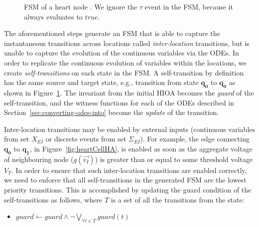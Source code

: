 
\begin{figure}
	\centering 
	\caption{\acf{FSM} of a heart node \label{fig:heartCellFSM}. We ignore
		the $\tau$ event in the \ac{FSM}, because it always evaluates to
		$true$.}
\end{figure}

The aforementioned steps generate an \ac{FSM} that is able to capture
the instantaneous transitions across locations called
\textit{inter-location} transitions, but is unable to capture the
evolution of the continuous variables via the \acp{ODE}. In order to
replicate the continuous evolution of variables within the locations, we
create \textit{self-transitions} on each state in the \ac{FSM}. A
self-transition by definition has the same source and target state,
e.g., transition from state $\mathbf{q_{0}}$ to $\mathbf{q_{0}}$ as shown in
Figure~\ref{fig:heartCellFSM}. The invariant from the initial
\ac{HIOA} becomes the \emph{guard} of the self-transition, and the witness
functions for each of the \acp{ODE} described in
Section~\ref{sec:converting-odes-into} become the \emph{update} of the
transition.

Inter-location transitions may be enabled by external inputs (continuous 
variables from set $X_{EI}$ or discrete events from set $\Sigma_{EI}$). For 
example, the edge connecting $\mathbf{q_{0}}$ to $\mathbf{q_{1}}$, in 
Figure~\ref{fig:heartCellHA},
is enabled as soon as the aggregate voltage of neighbouring node
($g(\vec{v_{I}})$) is greater than or equal to some threshold voltage
$V_{T}$. In order to ensure that such inter-location transitions are
enabled correctly, we need to enforce that all self-transitions in the
generated \ac{FSM} are the lowest priority transitions. This is
accomplished by updating the guard condition of the self-transitions as
follows, where $T$ is a set of all the transitions from the state:
\begin{itemize}
\item
  $guard \leftarrow guard \wedge \neg \bigvee_{\forall t \in
    T} guard(t)$
\end{itemize}

